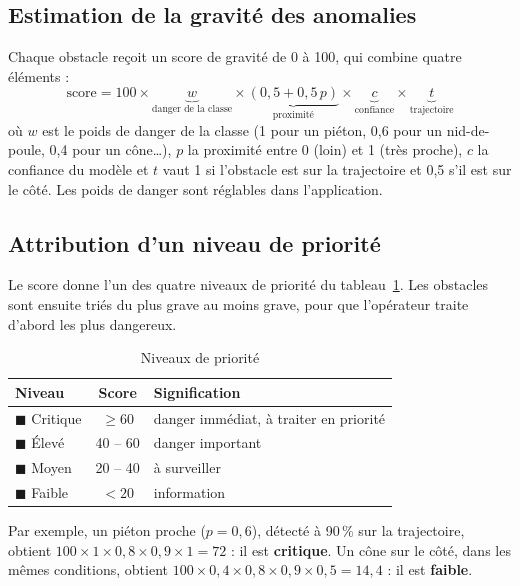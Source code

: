 \subsection{Estimation de la gravité des anomalies}
Chaque obstacle reçoit un score de gravité de 0 à 100, qui combine quatre éléments :
\begin{equation}
  \text{score} = 100 \times \underbrace{w}_{\text{danger de la classe}} \times
  \underbrace{(0{,}5 + 0{,}5\,p)}_{\text{proximité}} \times \underbrace{c}_{\text{confiance}} \times
  \underbrace{t}_{\text{trajectoire}}
\end{equation}
où $w$ est le poids de danger de la classe (1 pour un piéton, 0,6 pour un nid-de-poule, 0,4 pour un cône…), $p$ la
proximité entre 0 (loin) et 1 (très proche), $c$ la confiance du modèle et $t$ vaut 1 si l'obstacle est sur la
trajectoire et 0,5 s'il est sur le côté. Les poids de danger sont réglables dans l'application.

\subsection{Attribution d'un niveau de priorité}
Le score donne l'un des quatre niveaux de priorité du tableau~\ref{tab:niveaux}. Les obstacles sont ensuite triés du
plus grave au moins grave, pour que l'opérateur traite d'abord les plus dangereux.

\begin{table}[H]
\centering\small
\caption{Niveaux de priorité}
\label{tab:niveaux}
\begin{tabular}{l c l}
\toprule
\textbf{Niveau} & \textbf{Score} & \textbf{Signification} \\
\midrule
\textcolor{critique}{$\blacksquare$} Critique & $\geq 60$ & danger immédiat, à traiter en priorité \\
\textcolor{eleve}{$\blacksquare$} Élevé & 40 -- 60 & danger important \\
\textcolor{moyen}{$\blacksquare$} Moyen & 20 -- 40 & à surveiller \\
\textcolor{faible}{$\blacksquare$} Faible & $< 20$ & information \\
\bottomrule
\end{tabular}
\end{table}

Par exemple, un piéton proche ($p = 0{,}6$), détecté à 90\,\% sur la trajectoire, obtient
$100 \times 1 \times 0{,}8 \times 0{,}9 \times 1 = 72$ : il est \textbf{critique}. Un cône sur le côté, dans les mêmes
conditions, obtient $100 \times 0{,}4 \times 0{,}8 \times 0{,}9 \times 0{,}5 = 14{,}4$ : il est \textbf{faible}.

